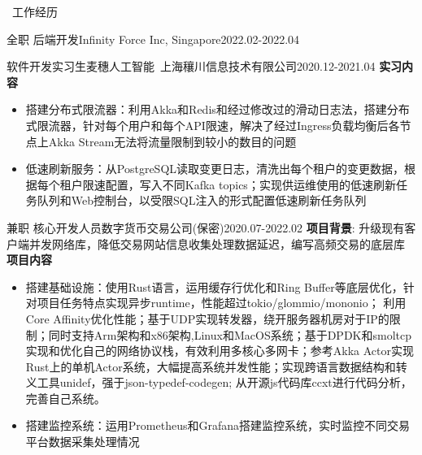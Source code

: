 \documentclass[UTF8]{resume}
\begin{document}
\begin{rSection}{\faBriefcase~工作经历}
\begin{rExperience}{全职 后端开发}{Infinity Force Inc, Singapore}{2022.02-2022.04}
\begin{itemize}
        \end{itemize}
    \end{rExperience}
    \begin{rExperience}{软件开发实习生}{麦穗人工智能~上海穰川信息技术有限公司}{2020.12-2021.04}
        \textbf{实习内容}
        \begin{itemize}
            \itemsep -0.5em \vspace{-0.5em}
            \item 搭建分布式限流器：利用Akka和Redis和经过修改过的滑动日志法，搭建分布式限流器，针对每个用户和每个API限速，解决了经过Ingress负载均衡后各节点上Akka Stream无法将流量限制到较小的数目的问题
            \item 低速刷新服务：从PostgreSQL读取变更日志，清洗出每个租户的变更数据，根据每个租户限速配置，写入不同Kafka topics；实现供运维使用的低速刷新任务队列和Web控制台，以受限SQL注入的形式配置低速刷新任务队列
        \end{itemize}
    \end{rExperience}
    \begin{rExperience}{兼职 核心开发人员}{数字货币交易公司(保密)}{2020.07-2022.02}
        \textbf{项目背景}:
        升级现有客户端并发网络库，降低交易网站信息收集处理数据延迟，编写高频交易的底层库\\
        \textbf{项目内容}
        \begin{itemize}
            \itemsep -0.5em \vspace{-0.5em}
            \item 搭建基础设施：使用Rust语言，运用缓存行优化和Ring Buffer等底层优化，针对项目任务特点实现异步runtime，性能超过tokio/glommio/mononio； 利用Core Affinity优化性能；基于UDP实现转发器，绕开服务器机房对于IP的限制；同时支持Arm架构和x86架构,Linux和MacOS系统；基于DPDK和smoltcp实现和优化自己的网络协议栈，有效利用多核心多网卡；参考Akka Actor实现Rust上的单机Actor系统，大幅提高系统并发性能；实现跨语言数据结构和转义工具unidef，强于json-typedef-codegen; 从开源js代码库ccxt进行代码分析，完善自己系统。
            \item 搭建监控系统：运用Prometheus和Grafana搭建监控系统，实时监控不同交易平台数据采集处理情况

\end{itemize}
\end{rExperience}
\end{rSection}
\end{document}
